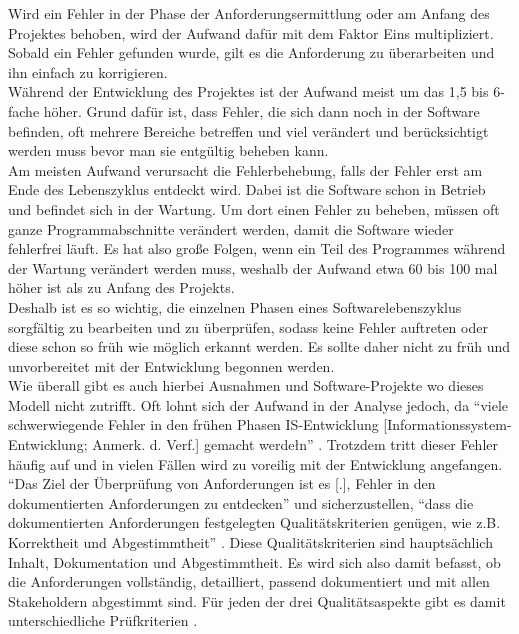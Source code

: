 \documentclass [12pt, a4paper, oneside, titlepage, ngerman]{article}
\begin{document}
\noindent Wird ein Fehler in der Phase der Anforderungsermittlung oder am Anfang des Projektes behoben, wird der Aufwand dafür mit dem Faktor Eins multipliziert. Sobald ein Fehler gefunden wurde, gilt es die Anforderung zu überarbeiten und ihn einfach zu korrigieren.\\
Während der Entwicklung des Projektes ist der Aufwand meist um das 1,5 bis 6-fache höher. Grund dafür ist, dass Fehler, die sich dann noch in der Software befinden, oft mehrere Bereiche betreffen und viel verändert und berücksichtigt werden muss bevor man sie entgültig beheben kann.\\
Am meisten Aufwand verursacht die Fehlerbehebung, falls der Fehler erst am Ende des Lebenszyklus entdeckt wird. Dabei ist die Software schon in Betrieb und befindet sich in der Wartung. Um dort einen Fehler zu beheben, müssen oft ganze Programmabschnitte verändert werden, damit die Software wieder fehlerfrei läuft. Es hat also große Folgen, wenn ein Teil des Programmes während der Wartung verändert werden muss, weshalb der Aufwand etwa 60 bis 100 mal höher ist als zu Anfang des Projekts. \\
Deshalb ist es so wichtig, die einzelnen Phasen eines Softwarelebenszyklus sorgfältig zu bearbeiten und zu überprüfen, sodass keine Fehler auftreten oder diese schon so früh wie möglich erkannt werden. Es sollte daher nicht zu früh und unvorbereitet mit der Entwicklung begonnen werden.\\
Wie überall gibt es auch hierbei Ausnahmen und Software-Projekte wo dieses Modell nicht zutrifft. Oft lohnt sich der Aufwand in der Analyse jedoch, da "`viele schwerwiegende Fehler in den frühen Phasen IS-Entwicklung [Informationssystem-Entwicklung; Anmerk. d. Verf.] gemacht werdełn"' \cite[S.316]{Alpar2016}. Trotzdem tritt dieser Fehler häufig auf und in vielen Fällen wird zu voreilig mit der Entwicklung angefangen. \\
"`Das Ziel der Überprüfung von Anforderungen ist es [.], Fehler in den dokumentierten Anforderungen zu entdecken"' \cite[S.95]{PohlRupp2015} und sicherzustellen, "`dass die dokumentierten Anforderungen festgelegten Qualitätskriterien genügen, wie z.B. Korrektheit und Abgestimmtheit"' \cite[S.95]{PohlRupp2015}. Diese Qualitätskriterien sind hauptsächlich Inhalt, Dokumentation und Abgestimmtheit. Es wird sich also damit befasst, ob die Anforderungen vollständig, detailliert, passend dokumentiert und mit allen Stakeholdern abgestimmt sind. Für jeden der drei Qualitätsaspekte gibt es damit unterschiedliche Prüfkriterien \cite[vgl.S. 97]{PohlRupp2015}.
\end{document}
